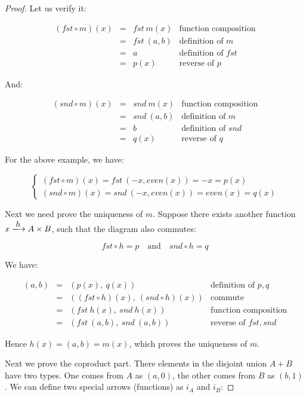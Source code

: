 \documentclass[UTF8]{article}
\begin{document}
\begin{proof}
Let us verify it:

\[
\begin{array}{rcll}
(fst \circ m)(x) & = & fst\ m(x) & \text{function composition} \\
                 & = & fst\ (a, b) & \text{definition of $m$} \\
                 & = & a & \text{definition of $fst$} \\
                 & = & p(x) & \text{reverse of $p$}
\end{array}
\]

And:

\[
\begin{array}{rcll}
(snd \circ m)(x) & = & snd\ m(x) & \text{function composition} \\
                 & = & snd\ (a, b) & \text{definition of $m$} \\
                 & = & b & \text{definition of $snd$} \\
                 & = & q(x) & \text{reverse of $q$}
\end{array}
\]

For the above example, we have:

\[
\begin{cases}
(fst \circ m)(x) = fst\ (-x, even(x)) = -x = p(x) \\
(snd \circ m)(x) = snd\ (-x, even(x)) = even(x) = q(x)
\end{cases}
\]

Next we need prove the uniqueness of $m$. Suppose there exists another function $x \arrowto{h} A \times B$, such that the diagram also commutes:

\[
fst \circ h = p \quad \text{and} \quad snd \circ h = q
\]

We have:

\[
\begin{array}{rcll}
(a, b) & = & (p(x),\ q(x)) & \text{definition of $p, q$} \\
       & = & ((fst \circ h)(x),\ (snd \circ h)(x)) & \text{commute} \\
       & = & (fst\ h(x),\ snd\ h(x)) & \text{function composition} \\
       & = & (fst\ (a, b),\ snd\ (a, b)) & \text{reverse of $fst, snd$}
\end{array}
\]

Hence $h(x) = (a, b) = m(x)$, which proves the uniqueness of $m$.

Next we prove the coproduct part. There elements in the disjoint union $A + B$ have two types. One comes from $A$ as $(a, 0)$, the other comes from $B$ as $(b, 1)$. We can define two special arrows (functions) as $i_A$ and $i_B$:


\end{proof}
\end{document}
